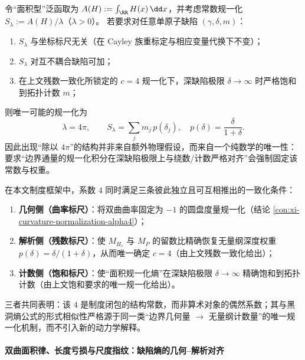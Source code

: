 \begin{proposition}
令“面积型”泛函取为
\(
A(H):=\int_{\RR}H(x)\,\dd x
 \)，并考虑常数规一化
\(
S_{\lambda}:=A(H)/\lambda
 \)（\(\lambda>0\)）。
若要求对任意单原子缺陷 \((\gamma,\delta,m)\)：
\begin{enumerate}
  \item \(S_{\lambda}\) 与坐标标尺无关（在 Cayley 族重标定与相应变量代换下不变）；
  \item \(S_{\lambda}\) 对互不耦合缺陷可加；
  \item 在上文残数一致化所锁定的 \(c=4\) 规一化下，深缺陷极限 \(\delta\to\infty\) 时严格饱和到拓扑计数 \(m\)；
\end{enumerate}
则唯一可能的规一化为
\[
\boxed{\;\lambda=4\pi,\qquad
S_{\lambda}=\sum_{j}m_j\,p(\delta_j),\quad p(\delta)=\frac{\delta}{1+\delta}.\;}
\]
因此出现“除以 \(4\pi\)”的结构并非来自额外物理假设，而来自一个纯数学的唯一性：要求“边界通量的规一化积分在深缺陷极限上与绕数/计数严格对齐”会强制固定该常数与权重。
\end{proposition}

\begin{proposition}
在本文制度框架中，系数 \(4\) 同时满足三条彼此独立且可互相推出的一致化条件：
\begin{enumerate}
  \item \textbf{几何侧（曲率标尺）}：将双曲曲率固定为 \(-1\) 的圆盘度量规一化（结论 \ref{con:xi-curvature-normalization-alpha4}）；
  \item \textbf{解析侧（残数标尺）}：使 \(M_{H_c}\) 与 \(M_P\) 的留数比精确恢复无量纲深度权重 \(p(\delta)=\delta/(1+\delta)\)，从而唯一确定 \(c=4\)（由上文残数一致化给出）；
  \item \textbf{计数侧（饱和标尺）}：使“面积规一化熵”在深缺陷极限 \(\delta\to\infty\) 精确饱和到拓扑计数（由上文饱和要求的唯一规一化给出）。
\end{enumerate}
三者共同表明：该 \(4\) 是制度闭包的结构常数，而非算术对象的偶然系数；其与黑洞熵公式的形式相似性严格源于同一类“边界几何量 \(\to\) 无量纲计数量”的唯一规一化机制，而不引入新的动力学解释。
\end{proposition}

\paragraph{双曲面积律、长度亏损与尺度指纹：缺陷熵的几何--解析对齐}

